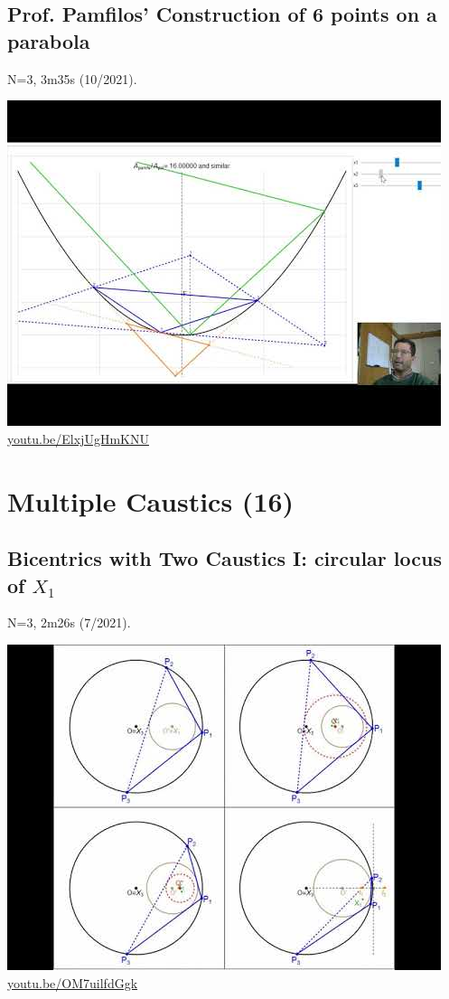 \documentclass[12pt]{amsart}
\begin{document}
\subsection{Prof. Pamfilos' Construction of 6 points on a parabola}
\label{vid:ElxjUgHmKNU}
\noindent N=3, 3m35s (10/2021). 
\begin{center}\includegraphics[width=.5\textwidth]{pics/ElxjUgHmKNU.jpg} \\ 
\href{https://youtu.be/ElxjUgHmKNU}{\url{youtu.be/ElxjUgHmKNU}}\end{center}
% 


\section{Multiple Caustics (16)}

\subsection{Bicentrics with Two Caustics I: circular locus of $X_{1}$}
\label{vid:OM7uilfdGgk}
\noindent N=3, 2m26s (7/2021). 
\begin{center}\includegraphics[width=.5\textwidth]{pics/OM7uilfdGgk.jpg} \\ 
\href{https://youtu.be/OM7uilfdGgk}{\url{youtu.be/OM7uilfdGgk}}\end{center}
% 
\end{document}
